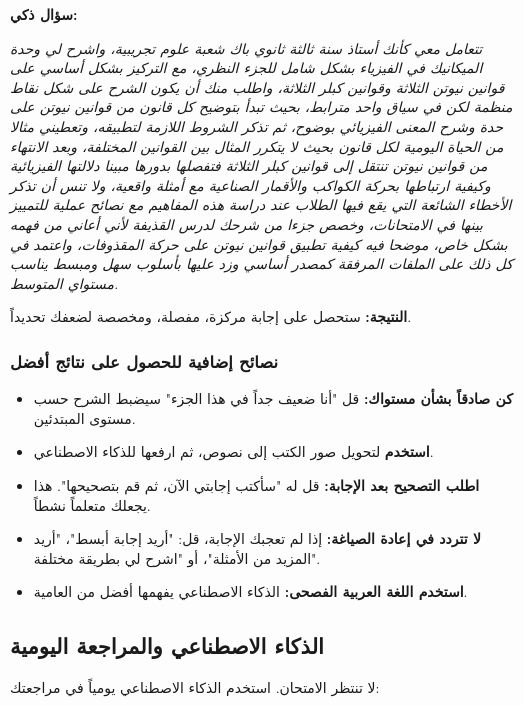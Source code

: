 \documentclass[12pt,a4paper]{book}
\newcommand{\quoteAr}[1]{%
	\begin{myquote}
		\itshape #1
	\end{myquote}
}
\begin{document}
\textbf{سؤال ذكي:} 
\quoteAr{تتعامل معي كأنك أستاذ سنة ثالثة ثانوي باك شعبة علوم تجريبية، واشرح لي وحدة الميكانيك في الفيزياء بشكل شامل للجزء النظري، مع التركيز بشكل أساسي على قوانين نيوتن الثلاثة وقوانين كبلر الثلاثة، واطلب منك أن يكون الشرح على شكل نقاط منظمة لكن في سياق واحد مترابط، بحيث تبدأ بتوضيح كل قانون من قوانين نيوتن على حدة وشرح المعنى الفيزيائي بوضوح، ثم تذكر الشروط اللازمة لتطبيقه، وتعطيني مثالا من الحياة اليومية لكل قانون بحيث لا يتكرر المثال بين القوانين المختلفة، وبعد الانتهاء من قوانين نيوتن تنتقل إلى قوانين كبلر الثلاثة فتفصلها بدورها مبينا دلالتها الفيزيائية وكيفية ارتباطها بحركة الكواكب والأقمار الصناعية مع أمثلة واقعية، ولا تنس أن تذكر الأخطاء الشائعة التي يقع فيها الطلاب عند دراسة هذه المفاهيم مع نصائح عملية للتمييز بينها في الامتحانات، وخصص جزءا من شرحك لدرس القذيفة لأني أعاني من فهمه بشكل خاص، موضحا فيه كيفية تطبيق قوانين نيوتن على حركة المقذوفات، واعتمد في كل ذلك على الملفات المرفقة كمصدر أساسي وزد عليها بأسلوب سهل ومبسط يناسب مستواي المتوسط.}

\textbf{النتيجة:} ستحصل على إجابة مركزة، مفصلة، ومخصصة لضعفك تحديداً.

\subsubsection{نصائح إضافية للحصول على نتائج أفضل}

\begin{itemize}
	\item \textbf{كن صادقاً بشأن مستواك:} قل "أنا ضعيف جداً في هذا الجزء" سيضبط الشرح حسب مستوى المبتدئين.
	\item \textbf{استخدم } لتحويل صور الكتب إلى نصوص، ثم ارفعها للذكاء الاصطناعي.
	\item \textbf{اطلب التصحيح بعد الإجابة:} قل له "سأكتب إجابتي الآن، ثم قم بتصحيحها". هذا يجعلك متعلماً نشطاً.
	\item \textbf{لا تتردد في إعادة الصياغة:} إذا لم تعجبك الإجابة، قل: "أريد إجابة أبسط"، "أريد المزيد من الأمثلة"، أو "اشرح لي بطريقة مختلفة".
	\item \textbf{استخدم اللغة العربية الفصحى:} الذكاء الاصطناعي يفهمها أفضل من العامية.
\end{itemize}

\subsection{الذكاء الاصطناعي والمراجعة اليومية}

لا تنتظر الامتحان. استخدم الذكاء الاصطناعي يومياً في مراجعتك:
\end{document}
